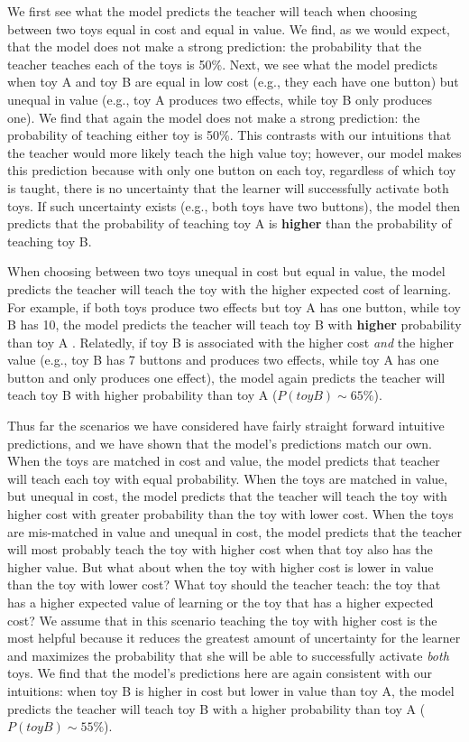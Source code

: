 \documentclass[10pt,letterpaper]{article}
\begin{document}
We first see what the model predicts the teacher will teach when choosing between two toys equal in cost and equal in value. We find, as we would expect, that the model does not make a strong prediction: the probability that the teacher teaches each of the toys is 50\%. Next, we see what the model predicts when toy A and toy B are equal in low cost (e.g., they each have one button) but unequal in value (e.g., toy A produces two effects, while toy B only produces one). We find that again the model does not make a strong prediction: the probability of teaching either toy is 50\%. This contrasts with our intuitions that the teacher would more likely teach the high value toy; however, our model makes this prediction because with only one button on each toy, regardless of which toy is taught, there is no uncertainty that the learner will successfully activate both toys. If such uncertainty exists (e.g., both toys have two buttons), the model then predicts that the probability of teaching toy A is \textbf{higher} than the probability of teaching toy B. 

When choosing between two toys unequal in cost but equal in value, the model predicts the teacher will teach the toy with the higher expected cost of learning. For example, if both toys produce two effects but toy A has one button, while toy B has 10, the model predicts the teacher will teach toy B with \textbf{higher} probability than toy A . Relatedly, if toy B is associated with the higher cost \textit{and} the higher value (e.g., toy B has 7 buttons and produces two effects, while toy A has one button and only produces one effect), the model again predicts the teacher will teach toy B with higher probability than toy A ($P(toyB) \sim 65\%$).

Thus far the scenarios we have considered have fairly straight forward intuitive predictions, and we have shown that the model's predictions match our own. When the toys are matched in cost and value, the model predicts that teacher will teach each toy with equal probability. When the toys are matched in value, but unequal in cost, the model predicts that the teacher will teach the toy with higher cost with greater probability than the toy with lower cost. When the toys are mis-matched in value and unequal in cost, the model predicts that the teacher will most probably teach the toy with higher cost when that toy also has the higher value. But what about when the toy with higher cost is lower in value than the toy with lower cost? What toy should the teacher teach: the toy that has a higher expected value of learning or the toy that has a higher expected cost? We assume that in this scenario teaching the toy with higher cost is the most helpful because it reduces the greatest amount of uncertainty for the learner and maximizes the probability that she will be able to successfully activate \textit{both} toys. We find that the model's predictions here are again consistent with our intuitions: when toy B is higher in cost but lower in value than toy A, the model predicts the teacher will teach toy B with a higher probability than toy A ($P(toyB) \sim 55\%$).
\end{document}
